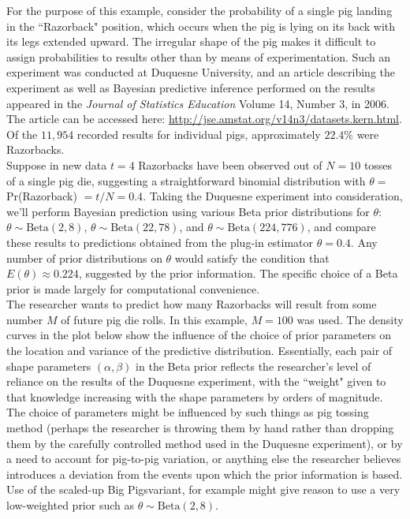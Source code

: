 \documentclass[12pt, a4paper]{article}
\begin{document}
\noindent For the purpose of this example, consider the probability of a single pig landing in the ``Razorback" position, which occurs when the pig is lying on its back with its legs extended upward.  The irregular shape of the pig makes it difficult to assign probabilities to results other than by means of experimentation.  Such an experiment was conducted at Duquesne University, and an article describing the experiment as well as Bayesian predictive inference performed on the results appeared in the \textit{Journal of Statistics Education} Volume 14, Number 3, in 2006.  The article can be accessed here:  \url{http://jse.amstat.org/v14n3/datasets.kern.html}. Of the $11,954$ recorded results for individual pigs, approximately $22.4\%$ were Razorbacks.\\

\noindent Suppose in new data $t=4$ Razorbacks have been observed out of $N=10$ tosses of a single pig die, suggesting a straightforward binomial distribution with $\theta =$ Pr(Razorback) $= t/N = 0.4$. Taking the Duquesne experiment into consideration, we'll perform Bayesian prediction using various Beta prior distributions for $\theta$: $\theta\sim\text{Beta}(2,8)$, $\theta\sim\text{Beta}(22,78)$, and $\theta\sim\text{Beta}(224,776)$, and compare these results to predictions obtained from the plug-in estimator $\theta = 0.4$.   Any number of prior distributions on $\theta$ would satisfy the condition that $E(\theta) \approx 0.224$, suggested by the prior information.  The specific choice of a Beta prior is made largely for computational convenience.\\

\noindent The researcher wants to predict how many Razorbacks will result from some number $M$ of future pig die rolls.  In this example, $M=100$ was used.  The density curves in the plot below show the influence of the choice of prior parameters on the location and variance of the predictive distribution.  Essentially, each pair of shape parameters $(\alpha,\beta)$ in the Beta prior reflects the researcher's level of reliance on the results of the Duquesne experiment, with the ``weight" given to that knowledge increasing with the shape parameters by orders of magnitude.  The choice of parameters might be influenced by such things as pig tossing method (perhaps the researcher is throwing them by hand rather than dropping them by the carefully controlled method used in the Duquesne experiment), or by a need to account for pig-to-pig variation, or anything else the researcher believes introduces a deviation from the events upon which the prior information is based.  Use of the scaled-up Big Pigs\texttrademark  variant, for example might give reason to use a very low-weighted prior such as $\theta\sim\text{Beta}(2,8)$.
\end{document}
